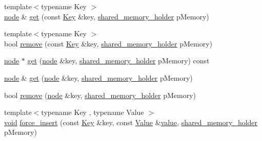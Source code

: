 \begin{DoxyCompactItemize}
\item 
{\footnotesize template$<$typename Key $>$ }\\\mbox{\hyperlink{class_y_a_m_l_1_1detail_1_1node}{node}} \& \mbox{\hyperlink{class_y_a_m_l_1_1detail_1_1node__ref_a9d2ed4bc11b098f700120538c165d4a5}{get}} (const \mbox{\hyperlink{namespace_y_a_m_l_a67c320aa50d3de7ecba1d0b8775dd684a1af533fc24b0311b8c4d5ac2870283aa}{Key}} \&key, \mbox{\hyperlink{namespace_y_a_m_l_1_1detail_a228c4b3b6ba1058b474d40afc218e21d}{shared\+\_\+memory\+\_\+holder}} p\+Memory)
\item 
{\footnotesize template$<$typename Key $>$ }\\bool \mbox{\hyperlink{class_y_a_m_l_1_1detail_1_1node__ref_a02a59cbb7cef49ffa2c2b4f2ec52e7a7}{remove}} (const \mbox{\hyperlink{namespace_y_a_m_l_a67c320aa50d3de7ecba1d0b8775dd684a1af533fc24b0311b8c4d5ac2870283aa}{Key}} \&key, \mbox{\hyperlink{namespace_y_a_m_l_1_1detail_a228c4b3b6ba1058b474d40afc218e21d}{shared\+\_\+memory\+\_\+holder}} p\+Memory)
\item 
\mbox{\hyperlink{class_y_a_m_l_1_1detail_1_1node}{node}} $\ast$ \mbox{\hyperlink{class_y_a_m_l_1_1detail_1_1node__ref_a34371a9210641b1631816578bfc7d946}{get}} (\mbox{\hyperlink{class_y_a_m_l_1_1detail_1_1node}{node}} \&key, \mbox{\hyperlink{namespace_y_a_m_l_1_1detail_a228c4b3b6ba1058b474d40afc218e21d}{shared\+\_\+memory\+\_\+holder}} p\+Memory) const
\item 
\mbox{\hyperlink{class_y_a_m_l_1_1detail_1_1node}{node}} \& \mbox{\hyperlink{class_y_a_m_l_1_1detail_1_1node__ref_a138908b9ef548bc8958475c12ee977a6}{get}} (\mbox{\hyperlink{class_y_a_m_l_1_1detail_1_1node}{node}} \&key, \mbox{\hyperlink{namespace_y_a_m_l_1_1detail_a228c4b3b6ba1058b474d40afc218e21d}{shared\+\_\+memory\+\_\+holder}} p\+Memory)
\item 
bool \mbox{\hyperlink{class_y_a_m_l_1_1detail_1_1node__ref_a2fdfda0864761192f51a031e018d12ae}{remove}} (\mbox{\hyperlink{class_y_a_m_l_1_1detail_1_1node}{node}} \&key, \mbox{\hyperlink{namespace_y_a_m_l_1_1detail_a228c4b3b6ba1058b474d40afc218e21d}{shared\+\_\+memory\+\_\+holder}} p\+Memory)
\item 
{\footnotesize template$<$typename Key , typename Value $>$ }\\\mbox{\hyperlink{glad_8h_a950fc91edb4504f62f1c577bf4727c29}{void}} \mbox{\hyperlink{class_y_a_m_l_1_1detail_1_1node__ref_a9ad0d590aefef1f9155ae00417cf43b4}{force\+\_\+insert}} (const \mbox{\hyperlink{namespace_y_a_m_l_a67c320aa50d3de7ecba1d0b8775dd684a1af533fc24b0311b8c4d5ac2870283aa}{Key}} \&key, const \mbox{\hyperlink{namespace_y_a_m_l_a67c320aa50d3de7ecba1d0b8775dd684a0d29a86853d6a9cfe0241ab7ea8da97c}{Value}} \&\mbox{\hyperlink{glad_8h_a03aff08f73d7fde3d1a08e0abd8e84fa}{value}}, \mbox{\hyperlink{namespace_y_a_m_l_1_1detail_a228c4b3b6ba1058b474d40afc218e21d}{shared\+\_\+memory\+\_\+holder}} p\+Memory)
\end{DoxyCompactItemize}


